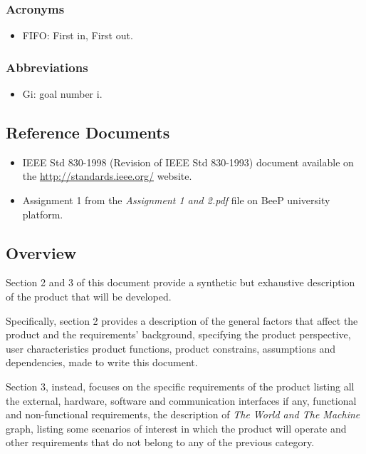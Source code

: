 		\subsubsection{Acronyms}
		\begin{itemize}
			\item FIFO: First in, First out.
		\end{itemize}
		\subsubsection{Abbreviations}
		\begin{itemize}
			\item Gi: goal number i.
		\end{itemize}
	\subsection{Reference Documents}
	\begin{itemize}
		\item IEEE Std 830-1998 (Revision of IEEE Std 830-1993) document available on the \url{http://standards.ieee.org/} website.
		\item Assignment 1 from the \emph{Assignment 1 and 2.pdf} file on BeeP university platform.
	\end{itemize}
	\subsection{Overview}
		Section 2 and 3 of this document provide a synthetic but exhaustive description of the product that will be developed.
				
		Specifically, section 2 provides a description of the general factors that affect the product and the requirements' background, specifying the product perspective, user characteristics product functions, product constrains, assumptions and dependencies, made to write this document.
		
		Section 3, instead, focuses on the specific requirements of the product listing all the external, hardware, software and communication interfaces if any, functional and non-functional requirements, the description of \emph{The World and The Machine} graph, listing some scenarios of interest in which the product will operate and other requirements that do not belong to any of the previous category. 
	
	
